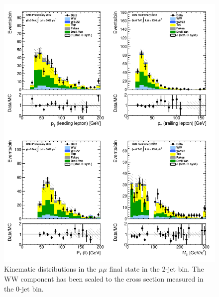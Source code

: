\begin{figure}[!hbtp]
\centering
\includegraphics[width=1\textwidth]{figures/ww_analysis20_0_ALL_mm_2j.pdf} %
\caption{Kinematic distributions in the $\mu\mu$ final state in the 2-jet bin.
The WW component has been scaled to the cross section measured in the 0-jet bin.}
\label{fig:xs_kinematics_mm_2j}
\end{figure}
